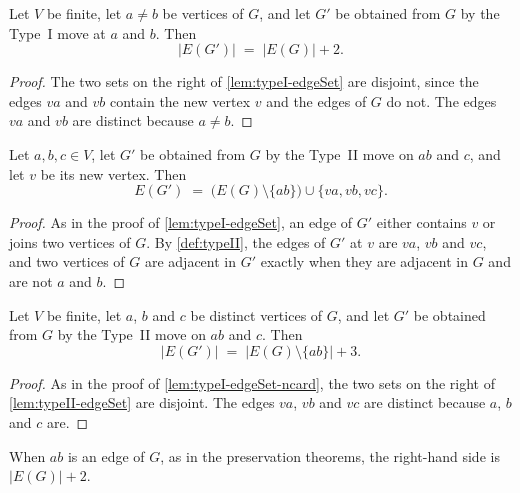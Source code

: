 \begin{lemma}
  \label{lem:typeI-edgeSet-ncard}
  \leanok
  Let $V$ be finite, let $a \ne b$ be vertices of $G$, and let $G'$ be
  obtained from $G$ by the Type~I move at $a$ and $b$. Then
  \[
    |E(G')| \;=\; |E(G)| + 2.
  \]
\end{lemma}
\begin{proof}
  \leanok
  The two sets on the right of \cref{lem:typeI-edgeSet} are disjoint,
  since the edges $va$ and $vb$ contain the new vertex $v$ and the
  edges of $G$ do not. The edges $va$ and $vb$ are distinct because
  $a \ne b$.
\end{proof}

\begin{lemma}
  \label{lem:typeII-edgeSet}
  \leanok
  Let $a, b, c \in V$, let $G'$ be obtained from $G$ by the Type~II
  move on $ab$ and $c$, and let $v$ be its new vertex. Then
  \[
    E(G') \;=\; \bigl(E(G) \setminus \{ab\}\bigr) \cup \{va, vb, vc\}.
  \]
\end{lemma}
\begin{proof}
  \leanok
  As in the proof of \cref{lem:typeI-edgeSet}, an edge of $G'$ either
  contains $v$ or joins two vertices of $G$. By \cref{def:typeII}, the
  edges of $G'$ at $v$ are $va$, $vb$ and $vc$, and two vertices of $G$
  are adjacent in $G'$ exactly when they are adjacent in $G$ and are
  not $a$ and $b$.
\end{proof}

\begin{lemma}
  \label{lem:typeII-edgeSet-ncard}
  \leanok
  Let $V$ be finite, let $a$, $b$ and $c$ be distinct vertices of $G$,
  and let $G'$ be obtained from $G$ by the Type~II move on $ab$ and
  $c$. Then
  \[
    |E(G')| \;=\; \bigl|E(G) \setminus \{ab\}\bigr| + 3.
  \]
\end{lemma}
\begin{proof}
  \leanok
  As in the proof of \cref{lem:typeI-edgeSet-ncard}, the two sets on
  the right of \cref{lem:typeII-edgeSet} are disjoint. The edges $va$,
  $vb$ and $vc$ are distinct because $a$, $b$ and $c$ are.
\end{proof}

When $ab$ is an edge of $G$, as in the preservation theorems, the
right-hand side is $|E(G)| + 2$.

